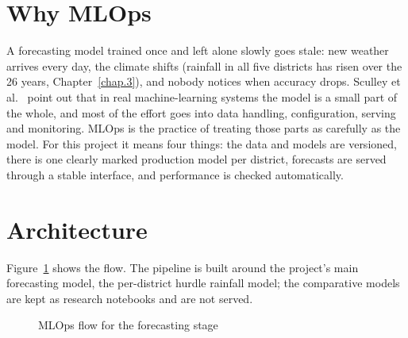 \label{chap.7}
\section{Why MLOps}
A forecasting model trained once and left alone slowly goes stale: new weather arrives every day, the climate shifts (rainfall in all five districts has risen over the 26 years, Chapter~\ref{chap.3}), and nobody notices when accuracy drops. Sculley et al.\ \cite{sculley2015hidden} point out that in real machine-learning systems the model is a small part of the whole, and most of the effort goes into data handling, configuration, serving and monitoring. MLOps is the practice of treating those parts as carefully as the model. For this project it means four things: the data and models are versioned, there is one clearly marked production model per district, forecasts are served through a stable interface, and performance is checked automatically.

\section{Architecture}
Figure~\ref{fig:mlops} shows the flow. The pipeline is built around the project's main forecasting model, the per-district hurdle rainfall model; the comparative models are kept as research notebooks and are not served.

\begin{figure}[H]
\centering
{}
\caption{MLOps flow for the forecasting stage}
\label{fig:mlops}
\end{figure}

